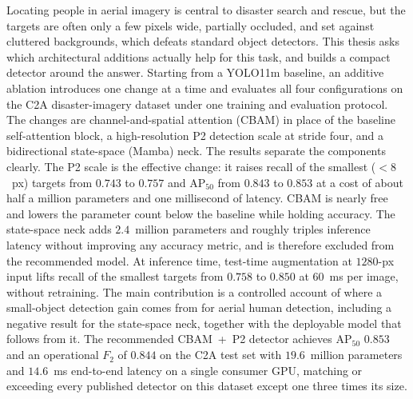 
Locating people in aerial imagery is central to disaster search and rescue, but
the targets are often only a few pixels wide, partially occluded, and set against
cluttered backgrounds, which defeats standard object detectors. This thesis asks
which architectural additions actually help for this task, and builds a compact
detector around the answer. Starting from a YOLO11m baseline, an additive ablation
introduces one change at a time and evaluates all four configurations on the C2A
disaster-imagery dataset under one training and evaluation protocol. The changes
are channel-and-spatial attention (CBAM) in place of the baseline self-attention
block, a high-resolution P2 detection scale at stride four, and a bidirectional
state-space (Mamba) neck. The results separate the components clearly. The P2 scale is
the effective change: it raises recall of the smallest ($<8$~px) targets from
$0.743$ to $0.757$ and $\mathrm{AP}_{50}$ from $0.843$ to $0.853$ at a cost of about
half a million parameters and one millisecond of latency. CBAM is nearly free and
lowers the parameter count below the baseline while holding accuracy. The
state-space neck adds $2.4$~million parameters and roughly triples inference latency
without improving any accuracy metric, and is therefore excluded from the
recommended model. At inference time, test-time augmentation at
$1280$-px input lifts recall of the smallest targets from $0.758$ to $0.850$
at $60$~ms per image, without retraining. The main contribution is a
controlled account of where a small-object detection gain comes from for
aerial human detection, including a negative result for the state-space neck,
together with the deployable model that follows from it. The recommended
CBAM~+~P2 detector achieves $\mathrm{AP}_{50}$ $0.853$ and an operational
$F_2$ of $0.844$ on the C2A test set with $19.6$~million parameters and
$14.6$~ms end-to-end latency on a single consumer GPU, matching or exceeding
every published detector on this dataset except one three times its size.
